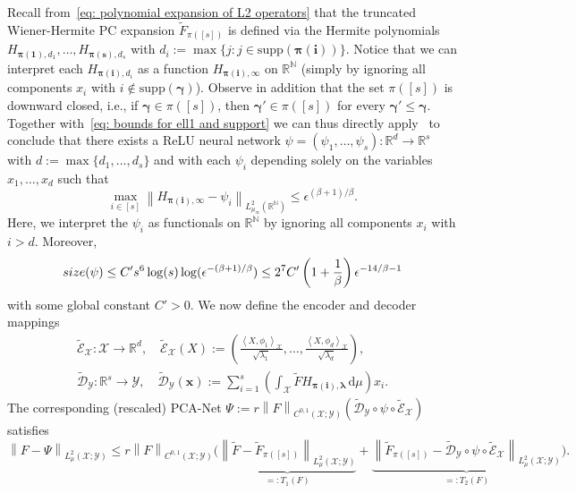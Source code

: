 \documentclass[namedate,webpdf]{ima-authoring-template-blank}
\newcommand*{\supp}{\mathrm{supp}}
\def\D{\,\mathrm{d}}
\newcommand*{\nm}[1]{{\left\|#1\right \|}}
\newcommand*{\ip}[2]{\left\langle #1, #2 \right\rangle}
\numberwithin{counter}{section}
\numberwithin{equation}{section}
\theoremstyle{plain}
\theoremstyle{definition}
\newcommand*{\cD}{\mathcal{D}}
\newcommand*{\cE}{\mathcal{E}}
\newcommand*{\cX}{\mathcal{X}}
\newcommand*{\cY}{\mathcal{Y}}
\newcommand*{\bbN}{\mathbb{N}}
\newcommand*{\bbR}{\mathbb{R}}
\newcommand*{\wtF}{\widetilde{F}}
\theoremstyle{thmstyletwo}
\begin{document}
Recall from~\eqref{eq: polynomial expansion of L2 operators} that the truncated Wiener-Hermite PC expansion \(\wtF_{\pi([s])}\) is defined via the Hermite polynomials \(H_{\bm{\pi(1)}, d_1}, \dots, H_{\bm{\pi(s)}, d_s}\) with \(d_i := \max \{j: j \in \supp(\bm{\pi(i)}) \}\). 
Notice that we can interpret each \(H_{\bm{\pi(i)}, d_i}\) as a function \(H_{\bm{\pi(i)}, \infty}\) on \(\bbR^{\bbN}\) (simply by ignoring all components \(x_i\) with \(i \not \in \supp(\bm{\gamma})\)). Observe in addition that the set \( \pi([s]) \) is downward closed, i.e., if \( \bm{\gamma} \in \pi([s]) \), then \( \bm{\gamma'} \in \pi([s]) \) for every \( \bm{\gamma'} \leq \bm{\gamma} \).
Together with~\eqref{eq: bounds for ell1 and support} we can thus directly apply~\citet[Thm. 3.9]{schwab_DeepLearningHighDimension_2023} to conclude that there exists a ReLU neural network \(\psi = (\psi_1, \dots, \psi_s): \bbR^d \to \bbR^s\) with \(d := \max\{ d_1, \dots, d_s \}\) and with each \(\psi_i\) depending solely on the variables \(x_1, \dots, x_d \) such that  
\begin{equation}
\label{eq: NN bounds for Hermite polynomials}
    \max_{i \in [s]} \nm{H_{\bm{\pi(i)}, \infty} - \psi_i}_{L_{\mu_{\infty}}^2(\bbR^{\bbN})} 
    \leq \epsilon^{(\beta + 1)/\beta}.
\end{equation}
Here, we interpret the \(\psi_i\) as functionals on \(\bbR^{\bbN}\) by ignoring all components \(x_i\) with \(i > d\). Moreover,
\begin{equation}
\label{eq: size bound for PCA-Net}
    \textup{size}(\psi) \leq C' s^6 \log(s) \log(\epsilon^{- (\beta + 1)/\beta})
    \leq 2^7 C' \left(1 + \frac{1}{\beta} \right)\epsilon^{- 14/\beta - 1}
\end{equation}
with some global constant \( C' > 0 \).
We now define the encoder and decoder mappings
\begin{align*}
    \widetilde{\cE}_{\cX}: \cX \to \bbR^d, \quad 
    \widetilde{\cE}_{\cX}(X) := \left( \frac{\ip{X}{\phi_1}_{\cX}}{\sqrt{\lambda_1}}, \dots,  \frac{\ip{X}{\phi_d}_{\cX}}{\sqrt{\lambda_d}} \right), \\
    \widetilde{\cD}_{\cY}: \bbR^s \to \cY, \quad
    \widetilde{\cD}_{\cY}(\bm{x}) := \sum_{i = 1}^s \left( \int_{\cX} \wtF H_{\bm{\pi(i)}, \bm{\lambda}} \D \mu \right) x_i.
\end{align*}
The corresponding (rescaled) PCA-Net \(\Psi := r \nm{F}_{C^{0, 1}(\cX; \cY)} \left( \widetilde{\cD}_{\cY} \circ \psi \circ \widetilde{\cE}_{\cX} \right)\) satisfies
\[
\nm{F - \Psi}_{L_{\mu}^2(\cX; \cY)}
\leq r \nm{F}_{C^{0, 1}(\cX; \cY)} \bigg( \underbrace{\nm{\wtF - \wtF_{\pi([s])}}_{L_{\mu}^2(\cX; \cY)}}_{=: T_1(F)} + \underbrace{\nm{\wtF_{\pi([s])} - \widetilde{\cD}_{\cY} \circ \psi \circ \widetilde{\cE}_{\cX}}_{L_{\mu}^2(\cX; \cY)}}_{=: T_2(F)} \bigg).
\]
\end{document}

